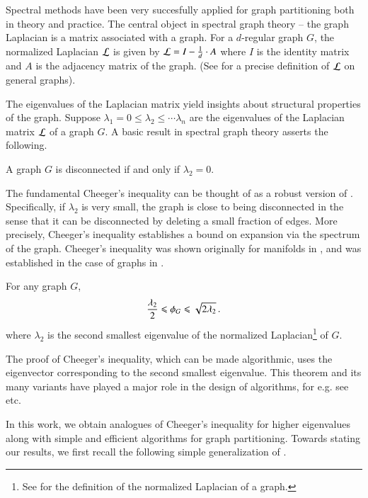 \documentclass[11pt]{article}
\begin{document}
Spectral methods have been very succesfully applied for graph partitioning both in theory and practice.  The central object in spectral graph theory -- the graph Laplacian is a matrix associated with a graph.  For a $d$-regular graph $G$, the normalized Laplacian $\mathcal L$ is given by $\mathcal L = I - \frac{1}{d} \cdot A$ where $I$ is the identity matrix and $A$ is the adjacency matrix of the graph.  (See  for a precise definition of $\mathcal L$ on general graphs).  

The eigenvalues of the Laplacian matrix yield insights about
structural properties of the graph.  Suppose $\lambda_1 = 0 \leq
\lambda_2 \leq \cdots \lambda_n$ are the eigenvalues of the Laplacian
matrix $\mathcal L$ of a graph $G$.  A basic result in spectral graph theory
asserts the following.
%
\begin{theorem} \label{thm:disconnected}
	A graph $G$ is disconnected if and only if $\lambda_2 = 0$.
\end{theorem}

The fundamental Cheeger's inequality can be thought of as a robust version of .  Specifically, if
$\lambda_2$ is very small, the graph is close to being disconnected in
the sense that it can be disconnected by deleting a small fraction of
edges.  More precisely, Cheeger's inequality establishes a bound on expansion via the spectrum of the graph.
Cheeger's inequality was shown originally for manifolds in \cite{c70},
and was established in the case of graphs in \cite{a86,am85}. 
%
\begin{theorem} 
\label{thm:Cheeger}
For any graph $G$,
\[ \frac{\lambda_2}{2} \leqslant \phi_G \leqslant \sqrt{2 \lambda_2} \,.  \]
where $\lambda_2$ is the second smallest eigenvalue of the normalized Laplacian\footnote{See 
  for the definition of the normalized Laplacian of a graph.}
 of $G$.
\end{theorem}
%
The proof of Cheeger's inequality, which can be made algorithmic, uses the eigenvector corresponding to the second smallest eigenvalue.
%
This theorem and its many variants have played a major role in the design of algorithms,
for e.g. see \cite{psl90,ds91,ss96,sm00,arv04} etc.

In this work, we obtain analogues of Cheeger's inequality for higher
eigenvalues along with simple and efficient algorithms for graph partitioning.  
Towards stating our results, we first recall the following simple
generalization of .
\end{document}
